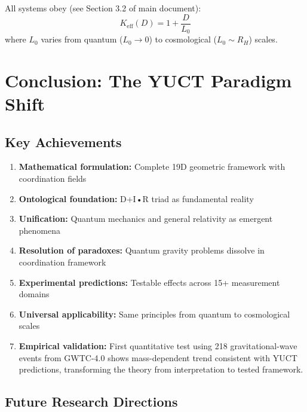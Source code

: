 \documentclass[12pt,a4paper]{article}
\theoremstyle{remark}
\newcommand{\Keff}{K_{\mathrm{eff}}}
\begin{document}
	All systems obey (see Section 3.2 of main document):
	\[
	\boxed{\Keff(D) = 1 + \frac{D}{L_0}}
	\]
	where $L_0$ varies from quantum ($L_0 \to 0$) to cosmological ($L_0 \sim R_H$) scales.
	
	\section{Conclusion: The YUCT Paradigm Shift}
	\label{sec:conclusion}
	
	\subsection{Key Achievements}
	
	\begin{enumerate}
		\item \textbf{Mathematical formulation:} Complete 19D geometric framework with coordination fields
		
		\item \textbf{Ontological foundation:} D+I•R triad as fundamental reality
		
		\item \textbf{Unification:} Quantum mechanics and general relativity as emergent phenomena
		
		\item \textbf{Resolution of paradoxes:} Quantum gravity problems dissolve in coordination framework
		
		\item \textbf{Experimental predictions:} Testable effects across 15+ measurement domains
		
		\item \textbf{Universal applicability:} Same principles from quantum to cosmological scales
		
		\item \textbf{Empirical validation:} First quantitative test using 218 gravitational-wave events from GWTC-4.0 shows mass-dependent trend consistent with YUCT predictions, transforming the theory from interpretation to tested framework.
	\end{enumerate}
	
	\subsection{Future Research Directions}
	
\end{document}
